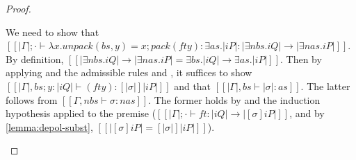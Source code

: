 \begin{proof}
\begin{caseof}
    \item {}
      We need to show that
      $[[|Γ| ; · ⊢  λx. unpack(bs, y) = x; pack (ft y) : ∃as.|iP| : |∃nbs.iQ| → |∃nas.iP| ]]$.
      By definition, 
      $[[|∃nbs.iQ| → |∃nas.iP| = ∃bs.|iQ| → ∃as.|iP|]]$.
      Then by applying  and 
      the admissible rules 
      and , 
      it suffices to show
      $[[|Γ|, bs; y : |iQ| ⊢ (ft y) : [|σ|]|iP|]]$
      and that $[[|Γ|, bs ⊢ |σ| : as]]$. 
      The latter follows from $[[Γ, nbs ⊢ σ : {nas}]]$.
      The former holds by  
      and the induction hypothesis applied to the premise
      ($[[|Γ|; · ⊢ ft : |iQ| → |[σ]iP|]]$, and by \cref{lemma:depol-subst}, $[[|[σ]iP| = [|σ|]|iP|]]$).
  \end{caseof}
\end{proof}

